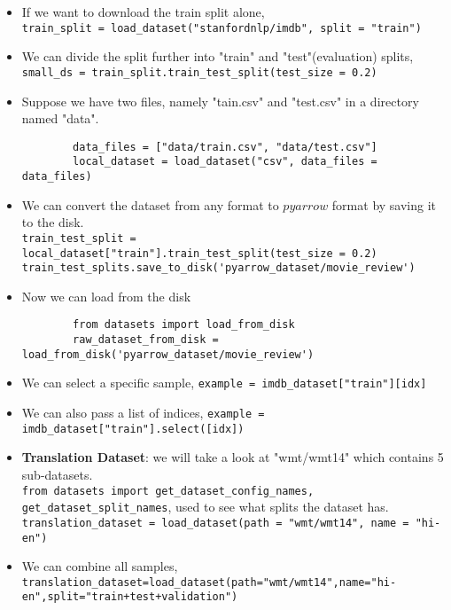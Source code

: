 \documentclass[a4paper]{article}
\begin{document}
\begin{itemize}
    \item If we want to download the train split alone,\\
    \verb|train_split = load_dataset("stanfordnlp/imdb", split = "train")|
    \item We can divide the split further into "train" and "test"(evaluation) splits,\\
    \verb|small_ds = train_split.train_test_split(test_size = 0.2)|
    \item Suppose we have two files, namely "tain.csv" and "test.csv" in a directory named "data".
    \vspace{-1mm}
    \begin{verbatim}
        data_files = ["data/train.csv", "data/test.csv"]
        local_dataset = load_dataset("csv", data_files = data_files)
    \end{verbatim}
    \vspace{-7mm}
    \item We can convert the dataset from any format to $pyarrow$ format by saving it to the disk.\\
    \verb|train_test_split = local_dataset["train"].train_test_split(test_size = 0.2)|\\
    \verb|train_test_splits.save_to_disk('pyarrow_dataset/movie_review')|
    \item Now we can load from the disk
    \vspace{-1mm}
    \begin{verbatim}
        from datasets import load_from_disk
        raw_dataset_from_disk = load_from_disk('pyarrow_dataset/movie_review')
    \end{verbatim}
    \vspace{-7mm}
    \item We can select a specific sample, \verb|example = imdb_dataset["train"][idx]|
    \item We can also pass a list of indices, \verb|example = imdb_dataset["train"].select([idx])|
    \item \textbf{Translation Dataset}: we will take a look at "wmt/wmt14" which contains 5 sub-datasets.\\
    \verb|from datasets import get_dataset_config_names, get_dataset_split_names|, used to see what splits the dataset has.\\
    \verb|translation_dataset = load_dataset(path = "wmt/wmt14", name = "hi-en")|
    \item We can combine all samples,\\
    \verb|translation_dataset=load_dataset(path="wmt/wmt14",name="hi-en",split="train+test+validation")|

\end{itemize}
\end{document}
